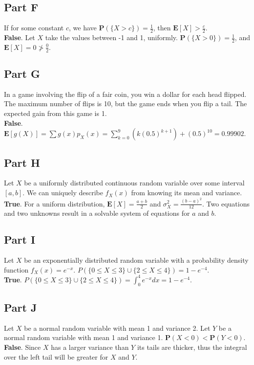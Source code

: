 \documentclass{amsart}
\begin{document}
	\subsection{Part F}
	If for some constant $c$, we have $\mathbf{P}(\{X>c\})=\frac{1}{2}$, then $\mathbf{E}[X]>\frac{c}{2}$.\\
	\textbf{False}. Let $X$ take the values between -1 and 1, uniformly. $\mathbf{P}(\{X>0\})=\frac{1}{2}$, and $\mathbf{E}[X] = 0 \ngtr \frac{0}{2}$.\\
	\subsection{Part G}
	In a game involving the flip of a fair coin, you win a dollar for each head flipped. The maximum number of flips is 10, but the game ends when you flip a tail. The expected gain from this game is 1.\\
	\textbf{False}. $\mathbf{E}[g(X)] = \sum g(x) p_X(x) = 
	\sum_{k=0}^{9}\left(k(0.5)^{k+1}\right) + (0.5)^{10} = 0.99902$.\\
	\subsection{Part H}
	Let $X$ be a uniformly distributed continuous random variable over some interval $[a,b]$. We can uniquely describe $f_X(x)$ from knowing its mean and variance.\\
	\textbf{True}. For a uniform distribution, $\mathbf{E}[X]=\frac{a+b}{2}$ and $\sigma_X^2 = \frac{(b-a)^2}{12}$. Two equations and two unknowns result in a solvable system of equations for $a$ and $b$.\\
	\subsection{Part I}
	Let $X$ be an exponentially distributed random variable with a probability density function $f_X(x)= e^{-x}$. $P\left(\{0 \leq X \leq 3\} \cup \{2 \leq X\leq 4\}\right) = 1-e^{-4}$.\\
	\textbf{True}. $P\left(\{0 \leq X \leq 3\} \cup \{2 \leq X\leq 4\}\right) = \int_{0}^{4}e^{-x}  dx = 1-e^{-4}$.\\
	\subsection{Part J}
	Let $X$ be a normal random variable with mean 1 and variance 2. Let $Y$ be a normal random variable with mean 1 and variance 1. $\mathbf{P}(X<0) < \mathbf{P}(Y<0)$.\\
	\textbf{False}. Since $X$ has a larger variance than $Y$ its tails are thicker, thus the integral over the left tail will be greater for $X$ and $Y$.
	\pagebreak
\end{document}
